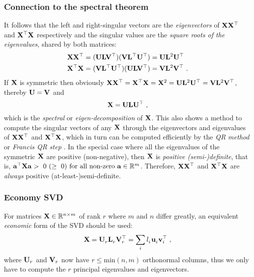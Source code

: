       \subsubsection{Connection to the spectral theorem}
	It follows that the left and right-singular vectors are the \emph{eigenvectors} of $\mathbf{X}\mathbf{X}^\top$ and $\mathbf{X}^\top \mathbf{X}$ respectively and the singular values are the \emph{square roots of the eigenvalues}, shared by both matrices:
	\begin{align}
	  \begin{split}
	    \nonumber &\mathbf{X}\mathbf{X}^\top = (\mathbf{U} \mathbf{L} \mathbf{V}^\top)(\mathbf{V} \mathbf{L}^\top \mathbf{U}^\top)
	    = \mathbf{U} \mathbf{L}^2 \mathbf{U}^\top\\
	    &\mathbf{X}^\top \mathbf{X} = (\mathbf{V} \mathbf{L}^\top \mathbf{U}^\top)(\mathbf{U} \mathbf{L} \mathbf{V}^\top)
	    = \mathbf{V} \mathbf{L}^2 \mathbf{V}^\top ~.
	  \end{split}
	\end{align}
	If $\mathbf{X}$ is symmetric then obviously $\mathbf{X}\mathbf{X}^\top = \mathbf{X}^\top \mathbf{X} = \mathbf{X}^2 = \mathbf{U} \mathbf{L}^2 \mathbf{U}^\top = \mathbf{V} \mathbf{L}^2 \mathbf{V}^\top$, thereby $\mathbf{U} = \mathbf{V}$ and
	\begin{equation}
	  \mathbf{X} = \mathbf{U} \mathbf{L} \mathbf{U}^\top ~,
	\end{equation}
	which is the \emph{spectral} or \emph{eigen-decomposition} of $\mathbf{X}$. This also shows a method to compute the singular vectors of any $\mathbf{X}$ through the eigenvectors and eigenvalues of $\mathbf{X}\mathbf{X}^\top$ and $\mathbf{X}^\top\mathbf{X}$, which in turn can be computed efficiently by the \emph{QR method} or \emph{Francis QR step} \citep{Golub:matrix96}. In the special case where all the eigenvalues of the symmetric $\mathbf{X}$ are positive (non-negative), then $\mathbf{X}$ is \emph{positive (semi-)definite}, that is, $\mathbf{a}^\top \mathbf{X} \mathbf{a} > ~ 0 ~ (\geq ~ 0) ~ \textrm{for all non-zero} ~ \mathbf{a} \in \mathbb{R}^{m}$. Therefore, $\mathbf{X}\mathbf{X}^\top$ and $\mathbf{X}^\top\mathbf{X}$ are \emph{always} positive (at-least-)semi-definite.

      \subsubsection{Economy SVD}
	For matrices $\mathbf{X}\in \mathbb{R}^{n \times m}$ of rank $r$ where $m$ and $n$ differ greatly, an equivalent \emph{economic} form of the SVD should be used:
	\[
	  \mathbf{X} = \mathbf{U}^{~}_r \mathbf{L}^{~}_r \mathbf{V}^\top_r  = \sum_i l^{~}_i \mathbf{u}^{~}_i \mathbf{v}^\top_i ~,
	\]
	where $\mathbf{U}_r$ and $\mathbf{V}_r$ now have $r\leq\textrm{min}(n,m)$ orthonormal columns, thus we only have to compute the $r$ principal eigenvalues and eigenvectors.

